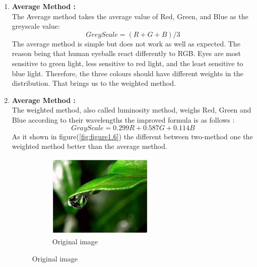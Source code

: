         \begin{enumerate}
                \item \textbf{Average Method :} \\
                The Average method takes the average value of Red, Green, and Blue as the greyscale value:
                \begin{equation}
                        GreyScale = (R + G + B) /3
                        \label{eq:equation}
                \end{equation}
                The average method is simple but does not work as well as expected.
                The reason being that human eyeballs react differently to RGB.
                Eyes are most sensitive to green light, less sensitive to red light,
                and the least sensitive to blue light. Therefore, the three colours should have
                different weights in the distribution. That brings us to the weighted method.
                \item \textbf{Average Method :} \\
                The weighted method, also called luminosity method, weighs Red,
                Green and Blue according to their wavelengths the improved formula is as follows :
                \begin{equation}
                        GrayScale = 0.299R + 0.587G + 0.114B
                        \label{eq:equation2}
                \end{equation}
                As it shown in figure(\ref{fig:figure1.6}) the different between two-method one the
                weighted method better than the average method.
                \begin{figure}[h]
                        \centering
                        \begin{subfigure}[b]{0.3\textwidth}
                                \centering
                                \includegraphics[width=5cm,height=4cm]{chapiter1/figures/original-grey.png}
                                \caption{Original image}
                        \end{subfigure}

\end{figure}
\end{enumerate}

